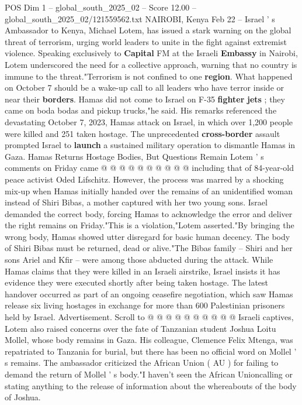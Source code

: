 \begin{textsample}{POS Dim 1 – global\_south\_2025\_02 – Score 12.00 – global\_south\_2025\_02/121559562.txt}  \label{ex:f1_pos_363}
NAIROBI, Kenya Feb 22 -- Israel ' s Ambassador to Kenya, Michael Lotem, has issued a stark warning on the global threat of terrorism, urging world leaders to unite in the fight against extremist violence.
Speaking exclusively to \textbf{Capital} FM at the Israeli \textbf{Embassy} in Nairobi, Lotem underscored the need for a collective approach, warning that no country is immune to the threat."Terrorism is not confined to one \textbf{region}.
What happened on October 7 should be a wake-up call to all leaders who have terror inside or near their \textbf{borders}.
Hamas did not come to Israel on F-35 \textbf{fighter} \textbf{jets} ; they came on boda bodas and pickup trucks,"he said.
His remarks referenced the devastating October 7, 2023, Hamas attack on Israel, in which over 1,200 people were killed and 251 taken hostage.
The unprecedented \textbf{cross-border} assault prompted Israel to \textbf{launch} a sustained military operation to dismantle Hamas in Gaza.
Hamas Returns Hostage Bodies, But Questions Remain Lotem ' s comments on Friday came @ @ @ @ @ @ @ @ @ @ including that of 84-year-old peace activist Oded Lifschitz.
However, the process was marred by a shocking mix-up when Hamas initially handed over the remains of an unidentified woman instead of Shiri Bibas, a mother captured with her two young sons.
Israel demanded the correct body, forcing Hamas to acknowledge the error and deliver the right remains on Friday."This is a violation,"Lotem asserted."By bringing the wrong body, Hamas showed utter disregard for basic human decency.
The body of Shiri Bibas must be returned, dead or alive."The Bibas family -- Shiri and her sons Ariel and Kfir -- were among those abducted during the attack.
While Hamas claims that they were killed in an Israeli airstrike, Israel insists it has evidence they were executed shortly after being taken hostage.
The latest handover occurred as part of an ongoing ceasefire negotiation, which saw Hamas release six living hostages in exchange for more than 600 Palestinian prisoners held by Israel.
Advertisement.
Scroll to @ @ @ @ @ @ @ @ @ @ Israeli captives, Lotem also raised concerns over the fate of Tanzanian student Joshua Loitu Mollel, whose body remains in Gaza.
His colleague, Clemence Felix Mtenga, was repatriated to Tanzania for burial, but there has been no official word on Mollel ' s remains.
The ambassador criticized the African Union ( AU ) for failing to demand the return of Mollel ' s body."I haven't seen the African Unioncalling or stating anything to the release of information about the whereabouts of the body of Joshua.

\end{textsample}
